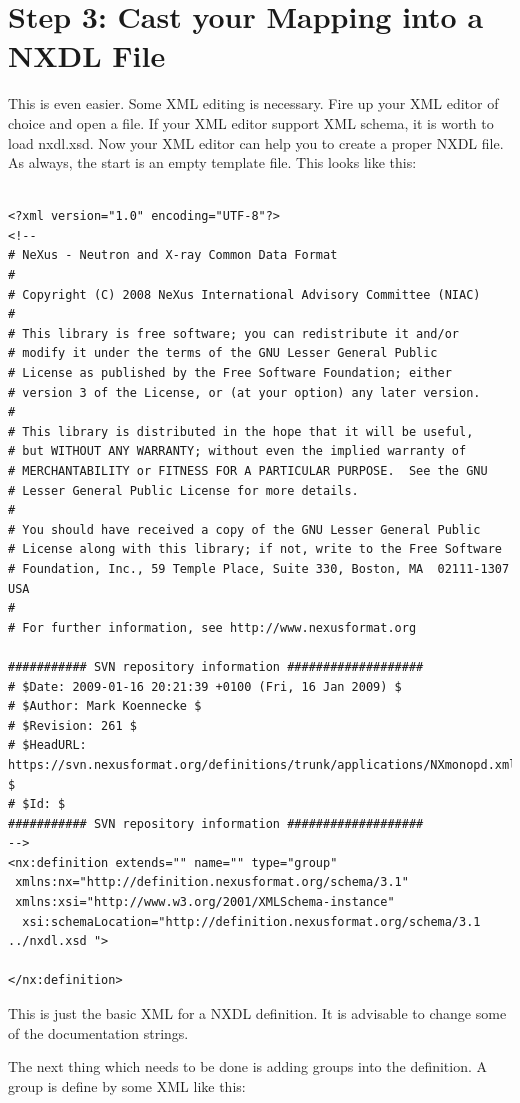 \documentclass[a4paper]{article}\usepackage[dvips]{graphicx}
\begin{document}
\section{Step 3: Cast your Mapping into a NXDL File }

This is even easier. Some XML editing is necessary. Fire up your XML editor of choice and open a file. 
If your XML editor support XML schema, it is worth to load nxdl.xsd. Now your XML editor can help you to 
create a proper NXDL file. As always, the start is an empty template file. This looks like this:


\begin{verbatim}

<?xml version="1.0" encoding="UTF-8"?>
<!--
# NeXus - Neutron and X-ray Common Data Format
# 
# Copyright (C) 2008 NeXus International Advisory Committee (NIAC)
# 
# This library is free software; you can redistribute it and/or
# modify it under the terms of the GNU Lesser General Public
# License as published by the Free Software Foundation; either
# version 3 of the License, or (at your option) any later version.
#
# This library is distributed in the hope that it will be useful,
# but WITHOUT ANY WARRANTY; without even the implied warranty of
# MERCHANTABILITY or FITNESS FOR A PARTICULAR PURPOSE.  See the GNU
# Lesser General Public License for more details.
#
# You should have received a copy of the GNU Lesser General Public
# License along with this library; if not, write to the Free Software
# Foundation, Inc., 59 Temple Place, Suite 330, Boston, MA  02111-1307  USA
#
# For further information, see http://www.nexusformat.org

########### SVN repository information ###################
# $Date: 2009-01-16 20:21:39 +0100 (Fri, 16 Jan 2009) $
# $Author: Mark Koennecke $
# $Revision: 261 $
# $HeadURL: https://svn.nexusformat.org/definitions/trunk/applications/NXmonopd.xml $
# $Id: $
########### SVN repository information ###################
-->
<nx:definition extends="" name="" type="group" 
 xmlns:nx="http://definition.nexusformat.org/schema/3.1" 
 xmlns:xsi="http://www.w3.org/2001/XMLSchema-instance" 
  xsi:schemaLocation="http://definition.nexusformat.org/schema/3.1 ../nxdl.xsd ">

</nx:definition>
\end{verbatim}
 
This is just the basic XML for a NXDL definition. It is advisable to change some of 
the documentation strings. 


The next thing which needs to be done is adding groups into the definition. A group is 
define by some XML like this:
\end{document}
